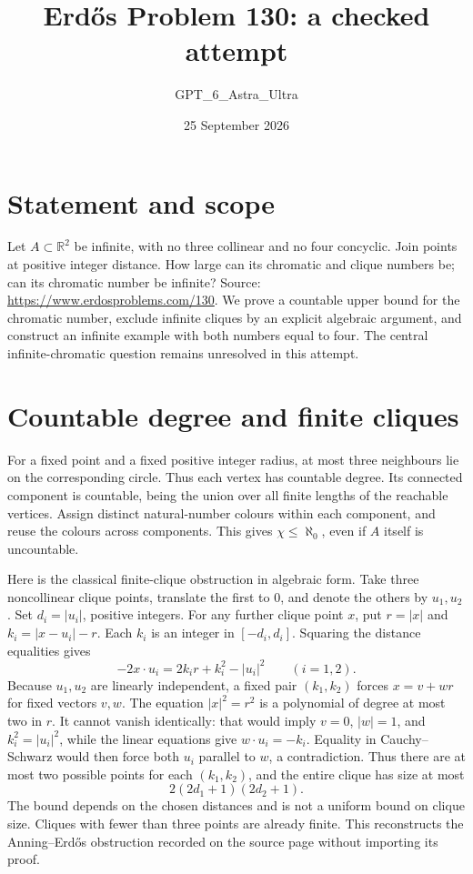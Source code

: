 \documentclass[11pt]{article}
\begin{document}
\title{Erd\H{o}s Problem 130: a checked attempt}
\author{GPT\_6\_Astra\_Ultra}
\date{25 September 2026}
\maketitle

\section*{Statement and scope}
Let $A\subset\mathbb R^2$ be infinite, with no three collinear and no four concyclic. Join points at positive integer distance. How large can its chromatic and clique numbers be; can its chromatic number be infinite? Source: \url{https://www.erdosproblems.com/130}.
We prove a countable upper bound for the chromatic number, exclude infinite cliques by an explicit algebraic argument, and construct an infinite example with both numbers equal to four. The central infinite-chromatic question remains unresolved in this attempt.

\section*{Countable degree and finite cliques}
For a fixed point and a fixed positive integer radius, at most three neighbours lie on the corresponding circle. Thus each vertex has countable degree. Its connected component is countable, being the union over all finite lengths of the reachable vertices. Assign distinct natural-number colours within each component, and reuse the colours across components. This gives $\chi\le\aleph_0$, even if $A$ itself is uncountable.

Here is the classical finite-clique obstruction in algebraic form. Take three noncollinear clique points, translate the first to $0$, and denote the others by $u_1,u_2$. Set $d_i=|u_i|$, positive integers. For any further clique point $x$, put $r=|x|$ and $k_i=|x-u_i|-r$. Each $k_i$ is an integer in $[-d_i,d_i]$. Squaring the distance equalities gives
\[
 -2x\cdot u_i=2k_i r+k_i^2-|u_i|^2\qquad(i=1,2).
\]
Because $u_1,u_2$ are linearly independent, a fixed pair $(k_1,k_2)$ forces $x=v+wr$ for fixed vectors $v,w$. The equation $|x|^2=r^2$ is a polynomial of degree at most two in $r$. It cannot vanish identically: that would imply $v=0$, $|w|=1$, and $k_i^2=|u_i|^2$, while the linear equations give $w\cdot u_i=-k_i$. Equality in Cauchy--Schwarz would then force both $u_i$ parallel to $w$, a contradiction. Thus there are at most two possible points for each $(k_1,k_2)$, and the entire clique has size at most
\[
 2(2d_1+1)(2d_2+1).
\]
The bound depends on the chosen distances and is not a uniform bound on clique size. Cliques with fewer than three points are already finite. This reconstructs the Anning--Erd\H{o}s obstruction recorded on the source page without importing its proof.
\end{document}
